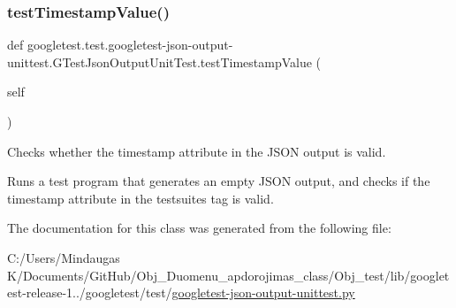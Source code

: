\subsubsection{\texorpdfstring{testTimestampValue()}{testTimestampValue()}}
{\footnotesize\ttfamily def googletest.\+test.\+googletest-\/json-\/output-\/unittest.\+G\+Test\+Json\+Output\+Unit\+Test.\+test\+Timestamp\+Value (\begin{DoxyParamCaption}\item[{}]{self }\end{DoxyParamCaption})}

\begin{DoxyVerb}Checks whether the timestamp attribute in the JSON output is valid.

Runs a test program that generates an empty JSON output, and checks if
the timestamp attribute in the testsuites tag is valid.
\end{DoxyVerb}
 

The documentation for this class was generated from the following file\+:\begin{DoxyCompactItemize}
\item 
C\+:/\+Users/\+Mindaugas K/\+Documents/\+Git\+Hub/\+Obj\+\_\+\+Duomenu\+\_\+apdorojimas\+\_\+class/\+Obj\+\_\+test/lib/googletest-\/release-\/1../googletest/test/\mbox{\hyperlink{_obj__test_2lib_2googletest-release-1_88_81_2googletest_2test_2googletest-json-output-unittest_8py}{googletest-\/json-\/output-\/unittest.\+py}}\end{DoxyCompactItemize}
